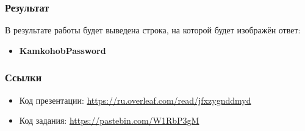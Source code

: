 \documentclass[t]{beamer}
\begin{document}
\begin{frame}[c]
	\begin{block}{}
    \frametitle{Результат}
		 {В результате работы будет выведена строка, на которой будет изображён ответ:}
	\end{block}
    \begin{itemize}
		\item \textbf{KamkohobPassword}
	\end{itemize}
\end{frame}

\begin{frame}[c]
    \frametitle{Ссылки}
	\begin{itemize}
		\item Код презентации: \href{https://ru.overleaf.com/read/jfxzygnddmyd}{https://ru.overleaf.com/read/jfxzygnddmyd}
		\item Код задания: \href{https://pastebin.com/W1RbP3gM}{https://pastebin.com/W1RbP3gM}
	\end{itemize}	
\end{frame}

\frame[plain]{\titlepage}
\end{document}
